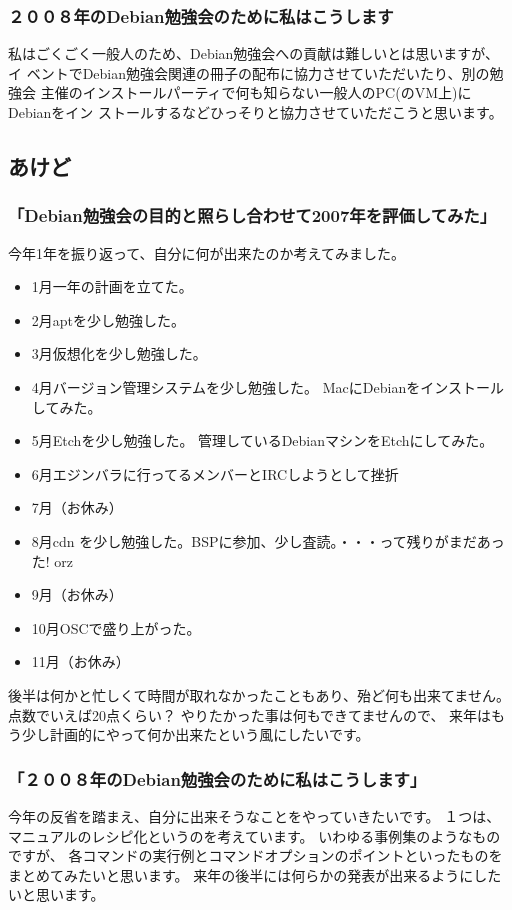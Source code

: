 \documentclass[mingoth,a4paper]{jsarticle}
\begin{document}
\subsubsection{２００８年のDebian勉強会のために私はこうします}

私はごくごく一般人のため、Debian勉強会への貢献は難しいとは思いますが、イ
ベントでDebian勉強会関連の冊子の配布に協力させていただいたり、別の勉強会
主催のインストールパーティで何も知らない一般人のPC(のVM上)にDebianをイン
ストールするなどひっそりと協力させていただこうと思います。

\subsection{あけど}


\subsubsection{「Debian勉強会の目的と照らし合わせて2007年を評価してみた」}

今年1年を振り返って、自分に何が出来たのか考えてみました。
\begin{itemize}
 \item  1月一年の計画を立てた。
 \item  2月aptを少し勉強した。
 \item  3月仮想化を少し勉強した。
 \item  4月バージョン管理システムを少し勉強した。 MacにDebianをインストールしてみた。
 \item  5月Etchを少し勉強した。 管理しているDebianマシンをEtchにしてみた。
 \item  6月エジンバラに行ってるメンバーとIRCしようとして挫折
 \item  7月（お休み）
 \item  8月cdn を少し勉強した。BSPに参加、少し査読。・・・って残りがまだあった! orz
 \item  9月（お休み）
 \item  10月OSCで盛り上がった。
 \item  11月（お休み）
\end{itemize}
後半は何かと忙しくて時間が取れなかったこともあり、殆ど何も出来てません。
点数でいえば20点くらい？
やりたかった事は何もできてませんので、
来年はもう少し計画的にやって何か出来たという風にしたいです。

\subsubsection{「２００８年のDebian勉強会のために私はこうします」}
今年の反省を踏まえ、自分に出来そうなことをやっていきたいです。
１つは、マニュアルのレシピ化というのを考えています。
いわゆる事例集のようなものですが、
各コマンドの実行例とコマンドオプションのポイントといったものを
まとめてみたいと思います。
来年の後半には何らかの発表が出来るようにしたいと思います。
\end{document}

